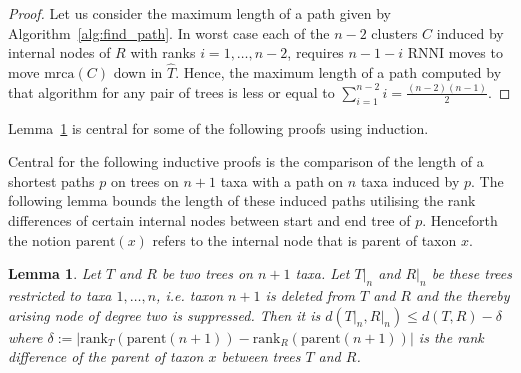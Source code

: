 \documentclass{amsart}
\newcommand{\parent}{\mathrm{parent}}
\newcommand{\mrca}{\mathrm{mrca}}
\newcommand{\rank}{\mathrm{rank}}
\newcommand{\rnni}{\mathrm{RNNI}}
\newtheorem{lemma}[definition]{Lemma}
\begin{document}
\begin{proof}
    Let us consider the maximum length of a path given by Algorithm~\ref{alg:find_path}.
    In worst case each of the $n-2$ clusters $C$ induced by internal nodes of $R$ with ranks $i = 1, \dots, n-2$, requires $n-1-i$ $\rnni$ moves to move $\mrca(C)$ down in $\hat{T}$.
	Hence, the maximum length of a path computed by that algorithm for any pair of trees is less or equal to $\sum\limits_{i = 1}^{n-2} i = \frac{(n-2)(n-1)}{2}$.
\end{proof}

Lemma~\ref{lemma:distance_delete_taxon} is central for some of the following proofs using induction.

Central for the following inductive proofs is the comparison of the length of a shortest paths $p$ on trees on $n+1$ taxa with a path on $n$ taxa induced by $p$.
The following lemma bounds the length of these induced paths utilising the rank differences of certain internal nodes between start and end tree of $p$.
Henceforth the notion $\parent(x)$ refers to the internal node that is parent of taxon $x$.

\begin{lemma}
    Let $T$ and $R$ be two trees on $n+1$ taxa.
    Let $T{\big|}_n$ and $R{\big|}_n$ be these trees restricted to taxa $1, \ldots, n$, i.e. taxon $n+1$ is deleted from $T$ and $R$ and the thereby arising node of degree two is suppressed.
    Then it is $d(T{\big|}_n, R{\big|}_n) \leq d(T,R) - \delta$ where $\delta:= |\rank_T(\parent(n+1)) - \rank_R(\parent(n+1))|$ is the rank difference of the parent of taxon $x$ between trees $T$ and $R$.
    \label{lemma:distance_delete_taxon}
\end{lemma}
\end{document}
